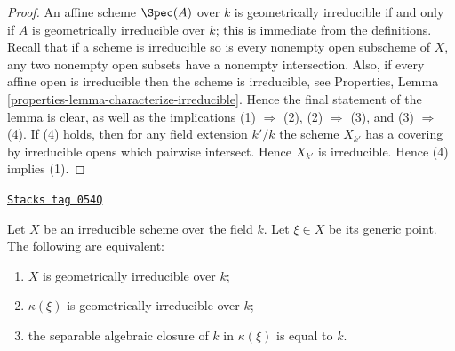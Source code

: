 \begin{proof}
An affine scheme $\Spec(A)$ over $k$ is geometrically
irreducible if and only if $A$ is geometrically irreducible over $k$;
this is immediate from the definitions.
Recall that if a scheme is irreducible so is every nonempty
open subscheme of $X$, any two nonempty open subsets have
a nonempty intersection. Also, if every affine open is irreducible
then the scheme is irreducible, see Properties,
Lemma \ref{properties-lemma-characterize-irreducible}.
Hence the final statement of the lemma
is clear, as well as the implications (1) $\Rightarrow$ (2),
(2) $\Rightarrow$ (3), and (3) $\Rightarrow$ (4). If (4) holds,
then for any field extension $k'/k$ the scheme $X_{k'}$
has a covering by irreducible opens which pairwise intersect.
Hence $X_{k'}$ is irreducible. Hence (4) implies (1).
\end{proof}

\begin{lemma}
\label{varieties-lemma-geometrically-irreducible-function-field}
\href{https://stacks.math.columbia.edu/tag/054Q}{\texttt{Stacks tag 054Q}}

Let $X$ be an irreducible scheme over the field $k$. Let $\xi \in X$
be its generic point. The following are equivalent:
\begin{enumerate}
\item $X$ is geometrically irreducible over $k$;
\item $\kappa(\xi)$ is geometrically irreducible over $k$;
\item the separable algebraic closure of $k$ in $\kappa(\xi)$ is equal to $k$.
\end{enumerate}
\end{lemma}

